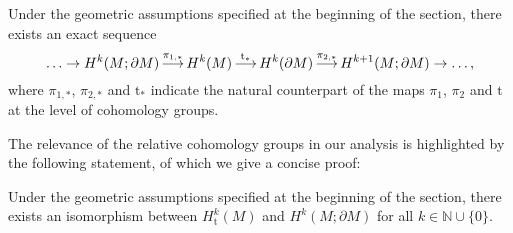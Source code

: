 \begin{propositio}\label{Prop: long exact sequence}
	Under the geometric assumptions specified at the beginning of the section, there exists an exact sequence
	\begin{equation}
	\ldots\to H^k(M;\partial M)\operatornamewithlimits{\longrightarrow}^{\pi_{1,*}} H^k(M) \operatornamewithlimits{\longrightarrow}^{\mathrm{t}_*} H^k(\partial M)\operatornamewithlimits{\longrightarrow}^{\pi_{2,*}} H^{k+1}(M;\partial M)\to\ldots,
	\end{equation}
	where $\pi_{1,*}$, $\pi_{2,*}$ and $\mathrm{t}_*$ indicate the natural counterpart of the maps $\pi_1$, $\pi_2$ and $\mathrm{t}$ at the level of cohomology groups.
\end{propositio}

\noindent The relevance of the relative cohomology groups in our analysis is highlighted by the following statement, of which we give a concise proof:

\begin{propositio}\label{Prop: equivalence description of relative cohomology}
	Under the geometric assumptions specified at the beginning of the section, there exists an isomorphism between $H^k_{\mathrm{t}}(M)$ and $H^k(M;\partial M)$ for all $k\in\mathbb{N}\cup\{0\}$.
\end{propositio}

